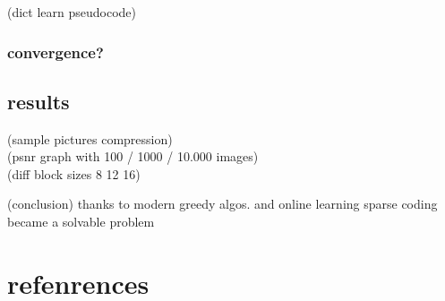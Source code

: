 \begin{frame}
(dict learn pseudocode)
\end{frame}

\subsubsection*{convergence?}
\begin{frame}
\end{frame}

\subsection{results}
\begin{frame}
(sample pictures compression) \\
(psnr graph with 100 / 1000 / 10.000 images) \\
(diff block sizes 8 12 16) \\
\end{frame}

\begin{frame}
(conclusion)
thanks to modern greedy algos. and online learning
sparse coding became a solvable problem

\end{frame}


\section{refenrences}
\begin{frame}


\nocite{*}


\end{frame}

